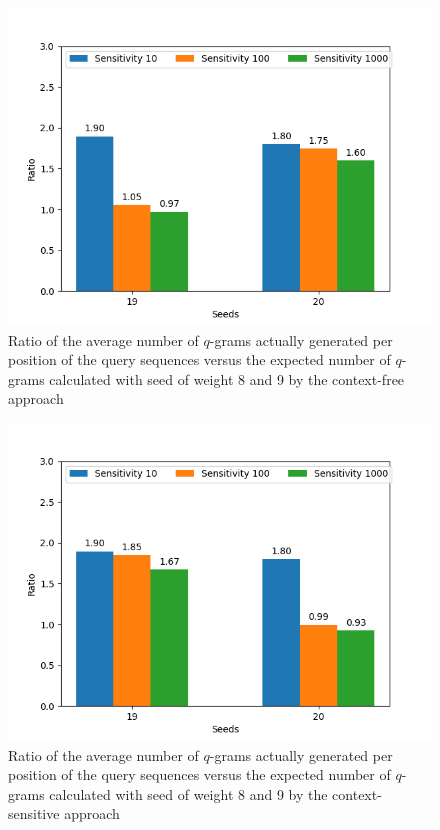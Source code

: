 \documentclass[twoside,a4paper,bsc]{master}
\begin{document}
\begin{figure}
\centering
\includegraphics[scale=0.7]{graphics/ctxfree_hiweight.png}
\caption{Ratio of the average number of \(q\)-grams actually generated per
position of the query sequences versus the expected number of \(q\)-grams
calculated with seed of weight 8 and 9 by the context-free approach}
\label{fig:ctxfree89}
\end{figure}

\begin{figure}
\centering
\includegraphics[scale=0.7]{graphics/ctxsens_hiweight.png}
\caption{Ratio of the average number of \(q\)-grams actually generated per
position of the query sequences versus the expected number of \(q\)-grams
calculated with seed of weight 8 and 9 by the context-sensitive approach}
\label{fig:ctxsens89}
\end{figure}
\end{document}
